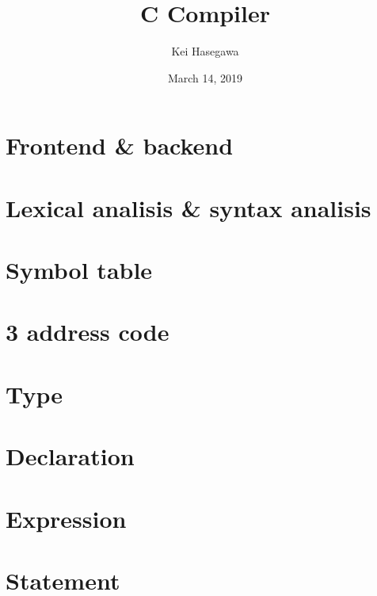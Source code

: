 \documentclass{report}
\begin{document}
\title{C Compiler}

\author{Kei Hasegawa}

\date{March 14, 2019}

\maketitle



\tableofcontents

\chapter{Frontend \& backend}



\chapter{Lexical analisis \& syntax analisis}



\chapter{Symbol table}



\chapter{3 address code}



\chapter{Type}



\chapter{Declaration}



\chapter{Expression}



\chapter{Statement}
\end{document}
